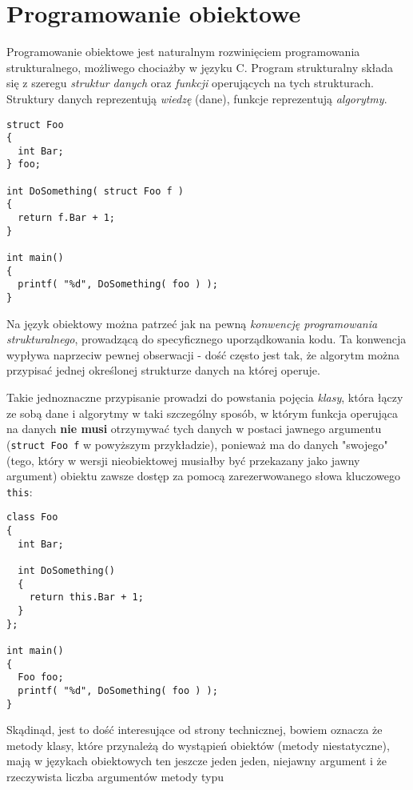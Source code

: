 ﻿\section{Programowanie obiektowe}

Programowanie obiektowe jest naturalnym rozwinięciem programowania strukturalnego, możliwego chociażby 
w języku C. Program strukturalny składa się z szeregu {\em struktur danych} oraz {\em funkcji} operujących na 
tych strukturach. Struktury danych reprezentują {\em wiedzę} (dane), funkcje reprezentują {\em algorytmy}.

\begin{scriptsize}
\begin{verbatim}
struct Foo
{
  int Bar;
} foo;

int DoSomething( struct Foo f ) 
{
  return f.Bar + 1;
}

int main()
{
  printf( "%d", DoSomething( foo ) );
}
\end{verbatim}
\end{scriptsize}

Na język obiektowy można patrzeć jak na pewną {\em konwencję programowania strukturalnego}, prowadzącą do specyficznego 
uporządkowania kodu. Ta konwencja wypływa naprzeciw pewnej obserwacji - dość często jest tak, że algorytm można
przypisać jednej określonej strukturze danych na której operuje. 

Takie jednoznaczne przypisanie prowadzi do powstania pojęcia {\em klasy}, która łączy ze sobą dane i algorytmy w taki
szczególny sposób, w którym funkcja operująca na danych {\bf nie musi} otrzymywać tych danych w postaci jawnego argumentu
({\tt struct Foo f} w powyższym przykładzie), ponieważ ma do danych "swojego" (tego, który w wersji nieobiektowej
musiałby być przekazany jako jawny argument) obiektu zawsze dostęp za pomocą
zarezerwowanego słowa kluczowego {\tt this}:

\begin{scriptsize}
\begin{verbatim}
class Foo
{
  int Bar;

  int DoSomething() 
  {
    return this.Bar + 1;
  }
};

int main()
{
  Foo foo; 
  printf( "%d", DoSomething( foo ) );
}
\end{verbatim}
\end{scriptsize}

Skądinąd, jest to dość interesujące od strony technicznej, bowiem oznacza że metody klasy, które przynależą
do wystąpień obiektów (metody niestatyczne), mają w językach obiektowych ten jeszcze jeden jeden, niejawny argument 
i że rzeczywista liczba argumentów metody typu

